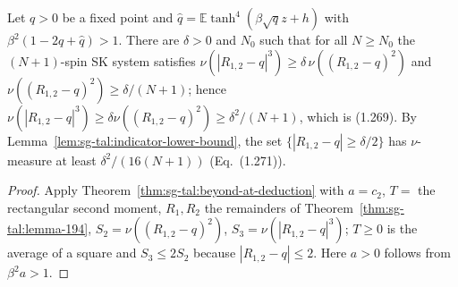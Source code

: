 \begin{theorem}
\label{thm:sg-tal:prop-192}
  \leanok
{}
Let $q>0$ be a fixed point and $\hat q=\mathbb E\tanh^4(\beta\sqrt qz+h)$ with $\beta^2(1-2q+\hat q)>1$.  There are $\delta>0$ and $N_0$ such that for all
$N\ge N_0$ the $(N+1)$-spin SK system satisfies $\nu(|R_{1,2}-q|^3)\ge\delta\,\nu((R_{1,2}-q)^2)$ and $\nu((R_{1,2}-q)^2)\ge\delta/(N+1)$; hence
$\nu(|R_{1,2}-q|^3)\ge\delta\nu((R_{1,2}-q)^2)\ge\delta^2/(N+1)$, which is (1.269).  By Lemma~\ref{lem:sg-tal:indicator-lower-bound}, the set
$\{|R_{1,2}-q|\ge\delta/2\}$ has $\nu$-measure at least $\delta^2/(16(N+1))$ (Eq.~(1.271)).
\end{theorem}
\begin{proof}
  \leanok
Apply Theorem~\ref{thm:sg-tal:beyond-at-deduction} with $a=c_2$, $T=$ the rectangular second moment, $R_1,R_2$ the remainders of
Theorem~\ref{thm:sg-tal:lemma-194}, $S_2=\nu((R_{1,2}-q)^2)$, $S_3=\nu(|R_{1,2}-q|^3)$; $T\ge0$ is the average of a square and $S_3\le2S_2$
because $|R_{1,2}-q|\le2$.  Here $a>0$ follows from $\beta^2a>1$.
\end{proof}

